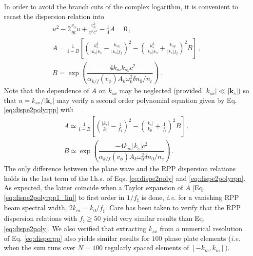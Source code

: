 \documentclass[
 reprint,
 superscriptaddress,
 amsmath,amssymb,
 aps,
]{revtex4-1}
\begin{document}
In order to avoid the branch cuts of the complex logarithm, it is convenient to recast the dispersion relation into 
\begin{align}
u^2 -2\frac{v_\phi}{\eta c}u +\frac{v_\phi^2}{\eta^2 c^2}-\frac{1}{4}A =0 
\, , \label{eq:dispe2polyrpp} \\
A= \frac{1}{1-B}\left[ \left(\frac{k_{s}^2}{\vert k_{s}\vert k_0}-\frac{k_{sy}}{\vert k_{s}\vert f_\sharp}\right)^2-\left(\frac{k_{s}^2}{\vert k_{s}\vert k_0}+\frac{k_{sy}}{\vert k_{s}\vert f_\sharp}\right)^2B  \right]\, , \label{eq:dispe2polyrpp1}  \\ 
B =\exp\left(\dfrac{-4k_m  k_{sy}c^2}{\alpha_{k/f}(v_\phi)A_k \omega_0^2\delta n_0/n_c  }\right)\, .
\label{eq:dispe2polyrpp2} 
\end{align}
Note that the dependence of $A$ on $k_{sx}$ may be neglected (provided  $\vert k_{sx}\vert \ll \vert \mathbf{k}_s\vert$)  so that  $u =  k_{sx}/\vert \mathbf{k}_s\vert$  may verify  a second order polynomial equation given by Eq. \eqref{eq:dispe2polyrpp} with
\begin{align}
A\simeq \frac{1}{1-B}\left[ \left(\frac{\vert k_{s}\vert}{k_0}-\frac{1}{f_\sharp}\right)^2-\left(\frac{\vert k_{s}\vert}{k_0}+\frac{1}{f_\sharp}\right)^2B  \right]\, , \label{eq:dispe2polyrpp1_lin}  \\ 
B \simeq \exp\left(\dfrac{-4k_m \vert k_{s}\vert c^2}{\alpha_{k/f}(v_\phi)A_k \omega_0^2\delta n_0/n_c  }\right)\, .
\label{eq:dispe2polyrpp2_lin} 
\end{align}
The only difference between the plane wave and the RPP dispersion relations holds in the last term of the l.h.s. of Eqs. \eqref{eq:dispe2poly} and \eqref{eq:dispe2polyrpp}. 
As expected,  the latter coincide when  a Taylor expansion of $A$ [Eq. \eqref{eq:dispe2polyrpp1_lin}] to first order  in $1/f_\sharp$ is done, \emph{i.e.} for a vanishing  RPP beam spectral width, $2k_m=k_0/f_\sharp$.
Care has been taken to verify that the RPP dispersion relations with  $f_\sharp \ge 50$ yield  very similar results than Eq. \eqref{eq:dispe2poly}. 
We also verified that extracting $k_{sx}$ from a numerical resolution of Eq. \eqref{eq:disperpp} also yields similar results for $100$ phase plate elements (\emph{i.e.} when the sum runs over $N=100$ regularly spaced elements of $[-k_m,k_m]$).
\end{document}
